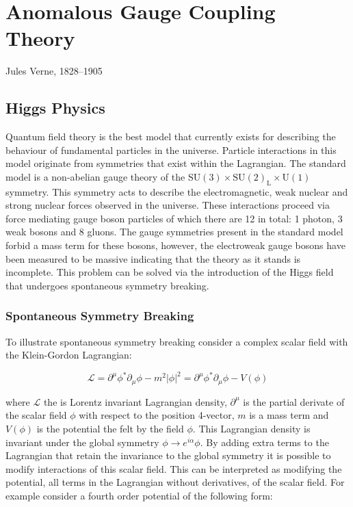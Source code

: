 \chapter{Anomalous Gauge Coupling Theory}
\label{chap:anomalousgaugecouplingtheory}

{Jules Verne, 1828--1905}


\section{Higgs Physics}
Quantum field theory is the best model that currently exists for describing the behaviour of fundamental particles in the universe.  Particle interactions in this model originate from symmetries that exist within the Lagrangian.  The standard model is a non-abelian gauge theory of the $\text{SU}(3) \times \text{SU}(2)_{\text{L}} \times \text{U}(1)$ symmetry.  This symmetry acts to describe the electromagnetic, weak nuclear and strong nuclear forces observed in the universe.  These interactions proceed via force mediating gauge boson particles of which there are 12 in total: 1 photon, 3 weak bosons and 8 gluons.  The gauge symmetries present in the standard model forbid a mass term for these bosons, however, the electroweak gauge bosons have been measured to be massive indicating that the theory as it stands is incomplete.  This problem can be solved via the introduction of the Higgs field that undergoes spontaneous symmetry breaking.

\subsection{Spontaneous Symmetry Breaking}
\label{sec:ssb}
To illustrate spontaneous symmetry breaking consider a complex scalar field \phi with the Klein-Gordon Lagrangian:

\begin{equation}
\mathcal{L} = \partial^{\mu} \phi^{*} \partial_{\mu} \phi -m^{2} |\phi|^{2} = \partial^{\mu} \phi^{*} \partial_{\mu} \phi - V(\phi)
\end{equation}

where $\mathcal{L}$ the is Lorentz invariant Lagrangian density, $\partial^{\mu}$ is the partial derivate of the scalar field $\phi$ with respect to the position 4-vector, $m$ is a mass term and $V(\phi)$ is the potential the felt by the field $\phi$.  This Lagrangian density is invariant under the global symmetry $\phi \rightarrow e^{i\alpha} \phi$.  By adding extra terms to the Lagrangian that retain the invariance to the global symmetry it is possible to modify interactions of this scalar field.  This can be interpreted as modifying the potential, all terms in the Lagrangian without derivatives, of the scalar field.  For example consider a fourth order potential of the following form:


